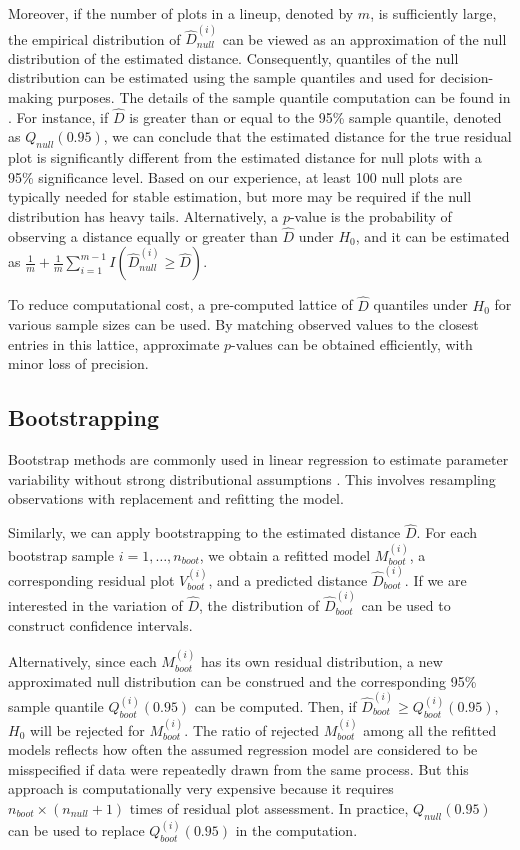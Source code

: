 \documentclass[]{interact}
\theoremstyle{plain}%
\theoremstyle{definition}
\theoremstyle{remark}
\begin{document}
Moreover, if the number of plots in a lineup, denoted by \(m\), is
sufficiently large, the empirical distribution of
\({\hat{D}_{null}^{(i)}}\) can be viewed as an approximation of the null
distribution of the estimated distance. Consequently, quantiles of the
null distribution can be estimated using the sample quantiles and used
for decision-making purposes. The details of the sample quantile
computation can be found in \citet{hyndman1996sample}. For instance, if
\(\hat{D}\) is greater than or equal to the 95\% sample quantile,
denoted as \(Q_{null}(0.95)\), we can conclude that the estimated
distance for the true residual plot is significantly different from the
estimated distance for null plots with a 95\% significance level. Based
on our experience, at least 100 null plots are typically needed for
stable estimation, but more may be required if the null distribution has
heavy tails. Alternatively, a \(p\)-value is the probability of
observing a distance equally or greater than \(\hat{D}\) under \(H_0\),
and it can be estimated as
\(\frac{1}{m} + \frac{1}{m}\sum_{i=1}^{m-1}I\left(\hat{D}_{null}^{(i)} \geq \hat{D}\right)\).

To reduce computational cost, a pre-computed lattice of \(\hat{D}\)
quantiles under \(H_0\) for various sample sizes can be used. By
matching observed values to the closest entries in this lattice,
approximate \(p\)-values can be obtained efficiently, with minor loss of
precision.

\subsection{Bootstrapping}\label{bootstrapping}

Bootstrap methods are commonly used in linear regression to estimate
parameter variability without strong distributional assumptions
\citep{davison1997bootstrap, efron1994introduction}. This involves
resampling observations with replacement and refitting the model.

Similarly, we can apply bootstrapping to the estimated distance
\(\hat{D}\). For each bootstrap sample \(i = 1, \dots, n_{boot}\), we
obtain a refitted model \(M^{(i)}_{boot}\), a corresponding residual
plot \(V^{(i)}_{boot}\), and a predicted distance
\(\hat{D}^{(i)}_{boot}\). If we are interested in the variation of
\(\hat{D}\), the distribution of \(\hat{D}^{(i)}_{boot}\) can be used to
construct confidence intervals.

Alternatively, since each \(M_{boot}^{(i)}\) has its own residual
distribution, a new approximated null distribution can be construed and
the corresponding 95\% sample quantile \(Q_{boot}^{(i)}(0.95)\) can be
computed. Then, if \(\hat{D}_{boot}^{(i)} \geq Q_{boot}^{(i)}(0.95)\),
\(H_0\) will be rejected for \(M_{boot}^{(i)}\). The ratio of rejected
\(M_{boot}^{(i)}\) among all the refitted models reflects how often the
assumed regression model are considered to be misspecified if data were
repeatedly drawn from the same process. But this approach is
computationally very expensive because it requires
\(n_{boot} \times (n_{null} + 1)\) times of residual plot assessment. In
practice, \(Q_{null}(0.95)\) can be used to replace
\(Q_{boot}^{(i)}(0.95)\) in the computation.
\end{document}
